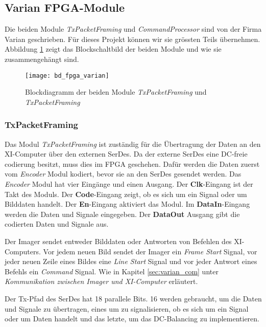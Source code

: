 \subsection{Varian FPGA-Module}
Die beiden Module \textit{TxPacketFraming} und \textit{CommandProcessor} sind von der Firma Varian geschrieben. Für dieses Projekt können wir sie grössten Teils übernehmen. Abbildung \ref{fig:bd_fpga_varian} zeigt das Blockschaltbild der beiden Module und wie sie zusammengehängt sind.

\begin{figure}[tb]
    \centering
    \texttt{[image: bd\_fpga\_varian]}
    \caption{Blockdiagramm der beiden Module \textit{TxPacketFraming} und \textit{TxPacketFraming}}
    \label{fig:bd_fpga_varian}
\end{figure}

\subsubsection*{TxPacketFraming}
Das Modul \textit{TxPacketFraming} ist zuständig für die Übertragung der Daten an den XI-Computer über den externen SerDes. Da der externe SerDes eine DC-freie codierung besitzt, muss dies im FPGA geschehen. Dafür werden die Daten zuerst vom \textit{Encoder} Modul kodiert, bevor sie an den SerDes gesendet werden. Das \textit{Encoder} Modul hat vier Eingänge und einen Ausgang.
Der \textbf{Clk}-Eingang ist der Takt des Moduls.
Der \textbf{Code}-Eingang zeigt, ob es sich um ein Signal oder um Bilddaten handelt.
Der \textbf{En}-Eingang aktiviert das Modul.
Im \textbf{DataIn}-Eingang werden die Daten und Signale eingegeben.
Der \textbf{DataOut} Ausgang gibt die codierten Daten und Signale aus.

Der Imager sendet entweder Bilddaten oder Antworten von Befehlen des XI-Computers. Vor jedem neuen Bild sendet der Imager ein \textit{Frame Start} Signal, vor jeder neuen Zeile eines Bildes eine \textit{Line Start} Signal und vor jeder Antwort eines Befehls ein \textit{Command} Signal. Wie in Kapitel \ref{sec:varian_com} unter \textit{Kommunikation zwischen Imager und XI-Computer} erläutert.

Der Tx-Pfad des SerDes hat 18 parallele Bits. 16 werden gebraucht, um die Daten und Signale zu übertragen, eines um zu signalisieren, ob es sich um ein Signal oder um Daten handelt und das letzte, um das DC-Balancing zu implementieren.

